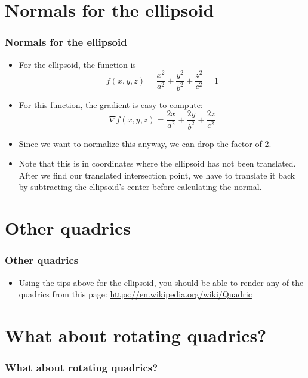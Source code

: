 \documentclass[slidestop,xcolor=pst]{beamer}
\newcommand{\sect}[1]{
\section{#1}
\begin{frame}[fragile]\frametitle{#1}
}
\newcommand{\bi}{\begin{itemize}}
\newcommand{\ei}{\end{itemize}}
\begin{document}
\sect{Normals for the ellipsoid}
\bi
\item For the ellipsoid, the function is
\[
f(x,y,z) = \frac{x^2}{a^2} + \frac{y^2}{b^2} + \frac{z^2}{c^2} = 1
\]
\item For this function, the gradient is easy to compute:
\[
\nabla f(x,y,z) = \frac{2x}{a^2} + \frac{2y}{b^2} + \frac{2z}{c^2}
\]
\item Since we want to normalize this anyway, we can drop the factor of 2.
\item
Note that this is in coordinates where the ellipsoid has not been
translated.  After we find our translated intersection point, we have
to translate it back by subtracting the ellipsoid's center before
calculating the normal.
\ei
\end{frame}

\sect{Other quadrics}
\bi
\item Using the tips above for the ellipsoid, you should be able to
  render any of the quadrics from this page:
  \url{https://en.wikipedia.org/wiki/Quadric}
  \ei
\end{frame}

\sect{What about rotating quadrics?}

\pause
\vfill
\hrulefill
\vfill


\end{frame}
\end{document}

